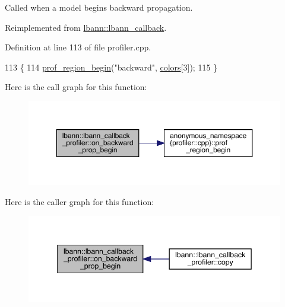 Called when a model begins backward propagation. 

Reimplemented from \hyperlink{classlbann_1_1lbann__callback_a2c0709a26179d115ff85b7561786ee27}{lbann\+::lbann\+\_\+callback}.



Definition at line 113 of file profiler.\+cpp.


\begin{DoxyCode}
113                                                              \{
114   \hyperlink{namespaceanonymous__namespace_02profiler_8cpp_03_ad2ea0278cd1f25dc30ddd76194ace64b}{prof\_region\_begin}(\textcolor{stringliteral}{"backward"}, \hyperlink{classlbann_1_1lbann__callback__profiler_addf3323ce665956dc4988e3850bceb30}{colors}[3]);
115 \}
\end{DoxyCode}
Here is the call graph for this function\+:\nopagebreak
\begin{figure}[H]
\begin{center}
\leavevmode
\includegraphics[width=350pt]{classlbann_1_1lbann__callback__profiler_a7905ac8f79a71731c8e388cdb4385023_cgraph}
\end{center}
\end{figure}
Here is the caller graph for this function\+:\nopagebreak
\begin{figure}[H]
\begin{center}
\leavevmode
\includegraphics[width=345pt]{classlbann_1_1lbann__callback__profiler_a7905ac8f79a71731c8e388cdb4385023_icgraph}
\end{center}
\end{figure}
\mbox{\label{classlbann_1_1lbann__callback__profiler_a158d8d47bd7a2e38a1f5589030fa523b}} 
